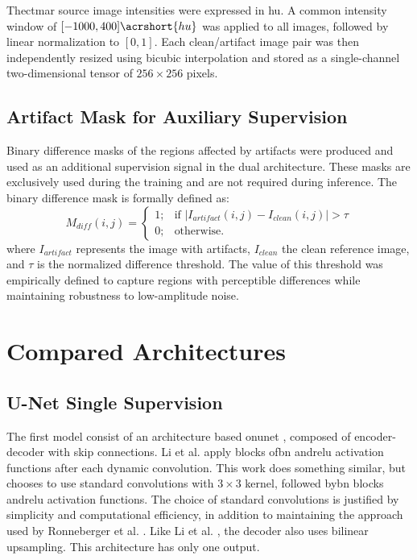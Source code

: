 The\acrshort{ctmar} source image intensities were expressed in \acrshort{hu}. A common intensity window of $[-1000, 400]\acrshort{hu}$ was applied to all images, followed by linear normalization to $[0,1]$. Each clean/artifact image pair was then independently resized using bicubic interpolation and stored as a single-channel two-dimensional tensor of $256 \times 256$ pixels.

\subsection{Artifact Mask for Auxiliary Supervision}
Binary difference masks of the regions affected by artifacts were produced and used as an additional supervision signal in the dual architecture. These masks are exclusively used during the training and are not required during inference. The binary difference mask is formally defined as: 
\begin{equation}
M_{diff}(i,j) = \begin{cases}
1 ; & \text{if } |I_{artifact}(i,j) - I_{clean}(i,j)| > \tau \\
0 ; & \text{otherwise}.
\end{cases}
\end{equation}
\noindent where $I_{artifact}$ represents the image with artifacts, $I_{clean}$ the clean reference image, and $\tau$ is the normalized difference threshold. The value of this threshold was empirically defined to capture regions with perceptible differences while maintaining robustness to low-amplitude noise.

\section{Compared Architectures}
\subsection{U-Net Single Supervision}

The first model consist of an architecture based on\acrshort{unet} \cite{ronnebergerUNetConvolutionalNetworks2015}, composed of encoder-decoder with skip connections. Li et al. \cite{liUNetBasedDynamic2024} apply blocks of\Acrfull{bn} and\acrfull{relu} activation functions after each dynamic convolution. This work does something similar, but chooses to use standard convolutions with $3\times3$ kernel, followed by\acrshort{bn} blocks and\acrshort{relu} activation functions. The choice of standard convolutions is justified by simplicity and computational efficiency, in addition to maintaining the approach used by Ronneberger et al. \cite{ronnebergerUNetConvolutionalNetworks2015}. Like Li et al. \cite{liUNetBasedDynamic2024}, the decoder also uses bilinear upsampling. This architecture has only one output.

